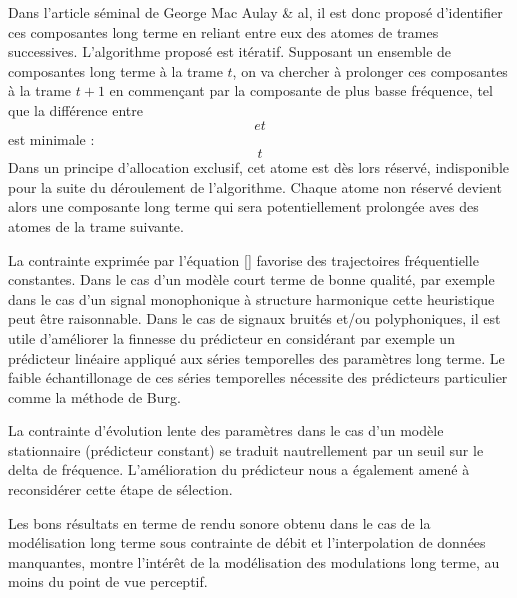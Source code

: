 Dans l'article séminal de George Mac Aulay \& al, il est donc proposé \og d'identifier \fg ces composantes long terme en reliant entre eux des atomes de trames successives. L'algorithme proposé est itératif. Supposant un ensemble de composantes long terme à la trame $t$, on va chercher à prolonger ces composantes à la trame $t+1$ en commençant par la composante de plus basse fréquence, tel que la différence entre $$ et $$ est minimale :
\begin{equation}
t
\end{equation}
Dans un principe d'allocation exclusif, cet atome est dès lors réservé, indisponible pour la suite du déroulement de l'algorithme. Chaque atome non réservé devient alors une composante long terme qui sera potentiellement prolongée aves des atomes de la trame suivante.

La contrainte exprimée par l'équation \ref{} favorise des trajectoires fréquentielle constantes. Dans le cas d'un modèle court terme de bonne qualité, par exemple dans le cas d'un signal monophonique à structure harmonique cette heuristique peut être raisonnable. Dans le cas de signaux bruités et/ou polyphoniques, il est utile d'améliorer la finnesse du prédicteur en considérant par exemple un prédicteur linéaire appliqué aux séries temporelles des paramètres long terme. Le faible échantillonage de ces séries temporelles nécessite des prédicteurs particulier comme la méthode de Burg\cite{}.

La contrainte d'évolution lente des paramètres dans le cas d'un modèle stationnaire (prédicteur constant) se traduit nautrellement par un seuil sur le delta de fréquence. L'amélioration du prédicteur nous a également amené à reconsidérer cette étape de sélection.

Les bons résultats en terme de rendu sonore obtenu dans le cas  de la modélisation long terme sous contrainte de débit\cite{lagrangeTaslp06} et l'interpolation de données manquantes\cite{lagrangeJaes05}, montre l'intérêt de la modélisation des modulations long terme, au moins du point de vue perceptif.

